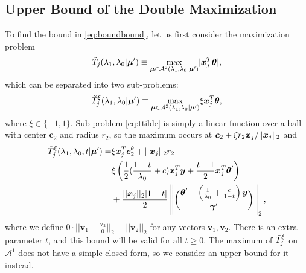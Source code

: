 \subsection{Upper Bound of the Double Maximization}
\label{sec:double-bound}

To find the bound in \eqref{eq:boundbound}, let us first consider the maximization problem
\begin{equation}
    \Tilde{T}_j(\lambda_1,\lambda_0|\boldsymbol\mu')\equiv\underset{\boldsymbol\mu\in\mathcal{A}^2(\lambda_1,\lambda_0|\boldsymbol\mu')}{\mathrm{max}}|\boldsymbol x_j^T\boldsymbol\theta|,
\end{equation}
which can be separated into two sub-problems:
\begin{equation}
    \label{eq:ttilde}
    \Tilde{T}^\xi_j(\lambda_1,\lambda_0|\boldsymbol\mu')\equiv\underset{\boldsymbol\mu\in\mathcal{A}^2(\lambda_1,\lambda_0|\boldsymbol\mu')}{\mathrm{max}}\xi \boldsymbol x_j^T\boldsymbol\theta,
\end{equation}
where $\xi\in\{-1,1\}$. Sub-problem \eqref{eq:ttilde} is simply a linear function over a ball with center $\boldsymbol c_2$ and radius $r_2$, so the maximum occurs at $\boldsymbol c_2 +\xi r_2 \boldsymbol x_j / \lVert\boldsymbol x_j\rVert_2$ and
\begin{gather}
    \label{eq:ttildexi}
    \begin{aligned}
        \Tilde{T}^\xi_j(\lambda_1,\lambda_0,t|\boldsymbol\mu')=&\xi\boldsymbol x_j^T\boldsymbol c_2^\theta+||\boldsymbol x_j||_2r_2\\
        =&\xi\left( \frac{1}{2}(\frac{1-t}{\lambda_0}+c)\boldsymbol x_j^T\boldsymbol y+\frac{t+1}{2}\boldsymbol x_j^T\boldsymbol\theta'\right)\\
        &+\frac{||\boldsymbol x_j||_2|1-t|}{2}\left\Vert\binom{\boldsymbol\theta'-\left(\frac{1}{\lambda_0}+\frac{c}{1-t}\right)\boldsymbol y}{\boldsymbol\gamma'}\right\Vert_2,\\
    \end{aligned}
\end{gather}
where we define $0\cdot||\boldsymbol v_1+\frac{\boldsymbol v_2}{0}||_2\equiv ||\boldsymbol v_2||_2$ for any vectors $\boldsymbol v_1,\boldsymbol v_2$. There is an extra parameter $t$, and this bound will be valid for all $t\geq 0$. The maximum of $\Tilde{T}^\xi_j$ on $\mathcal{A}^1$ does not have a simple closed form, so we consider an upper bound for it instead.

